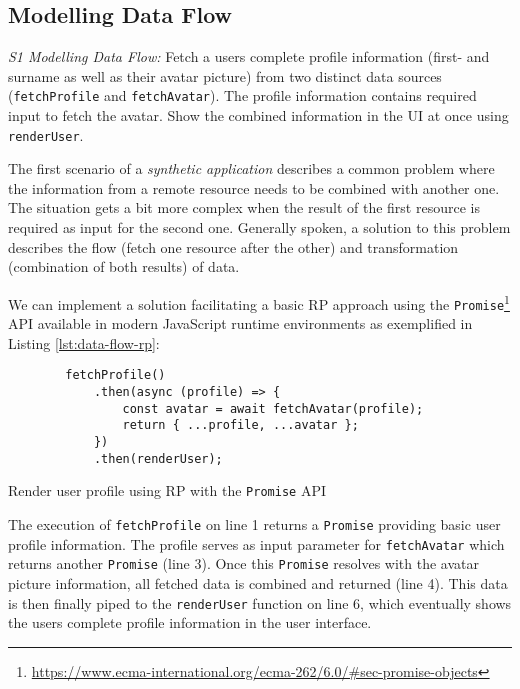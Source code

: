 \documentclass[12pt,a4paper]{article}
\begin{document}
\subsection{Modelling Data Flow}

\begin{framed}
	\noindent\emph{S1 Modelling Data Flow:} Fetch a users complete profile information (first- and surname as well as their avatar picture) from two distinct data sources (\texttt{fetchProfile} and \texttt{fetchAvatar}). The profile information contains required input to fetch the avatar. Show the combined information in the UI at once using \texttt{renderUser}.
\end{framed}

The first scenario of a \emph{synthetic application} \cite{7827078} describes a common problem where the information from a remote resource needs to be combined with another one. The situation gets a bit more complex when the result of the first resource is required as input for the second one. Generally spoken, a solution to this problem describes the flow (fetch one resource after the other) and transformation (combination of both results) of data.

We can implement a solution facilitating a basic RP approach using the \texttt{Promise}\footnote{\url{https://www.ecma-international.org/ecma-262/6.0/\#sec-promise-objects}} API available in modern JavaScript runtime environments as exemplified in Listing \ref{lst:data-flow-rp}:

\begin{listing}[H]
	\begin{verbatim}
		fetchProfile()
			.then(async (profile) => {
				const avatar = await fetchAvatar(profile);
				return { ...profile, ...avatar };
			})
			.then(renderUser);
	\end{verbatim}
	\caption{Render user profile using RP with the \texttt{Promise} API}
	\label{lst:data-flow-rp}
\end{listing}

The execution of \texttt{fetchProfile} on line 1 returns a \texttt{Promise} providing basic user profile information. The profile serves as input parameter for \texttt{fetchAvatar} which returns another \texttt{Promise} (line 3). Once this \texttt{Promise} resolves with the avatar picture information, all fetched data is combined and returned (line 4). This data is then finally piped to the \texttt{renderUser} function on line 6, which eventually shows the users complete profile information in the user interface.
\end{document}
